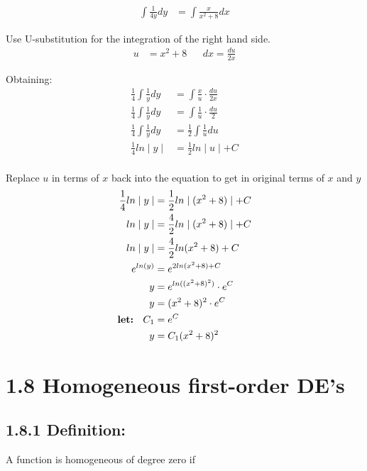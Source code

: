 \documentclass{article}
\begin{document}
\begin{flushleft}
{\begin{align*}
\int \frac{1}{4y} dy & = \int \frac{x}{x^2 + 8} dx
\end{align*}

Use U-substitution for the integration of the right hand side.
\begin{align*}
u & = x^2 + 8  && dx = \frac{du}{2x}
\end{align*}

Obtaining: \\
\begin{align*}
\frac{1}{4}\int\frac{1}{y}dy & = \int \frac{x}{u} \cdot \frac{du}{2x} \\
\frac{1}{4}\int\frac{1}{y}dy & = \int \frac{1}{u} \cdot \frac{du}{2} \\
\frac{1}{4}\int\frac{1}{y}dy & = \frac{1}{2} \int \frac{1}{u} du \\
\frac{1}{4}ln\mid y \mid & = \frac{1}{2} ln \mid u \mid + C \\
\end{align*}

Replace $u$ in terms of $x$ back into the equation to get in original terms of $x$ and $y$\\
\begin{align*}
\frac{1}{4}ln\mid y \mid & = \frac{1}{2} ln \mid (x^2 + 8) \mid + C \\
ln\mid y \mid & = \frac{4}{2} ln \mid (x^2 + 8) \mid + C \\
ln\mid y \mid & = \frac{4}{2} ln (x^2 + 8) + C \\
e^{ln(y)} & = e^{2ln(x^2+8) + C} \\
y & = e^{ln((x^2 + 8)^2)}\cdot e^C \\
y & = (x^2 + 8)^2 \cdot e^C \\
\text {\textbf{let: } } C_1 & = e^C \\
y & = C_1(x^2 + 8)^2 \\
\end{align*}
}
\section*{1.8 Homogeneous first-order DE’s}{

\subsection*{\textbf{1.8.1 Definition:}}
A function is homogeneous of degree zero if\\

}
\end{flushleft}
\end{document}
